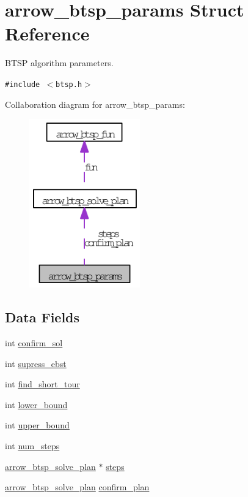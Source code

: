 \hypertarget{structarrow__btsp__params}{
\section{arrow\_\-btsp\_\-params Struct Reference}
\label{structarrow__btsp__params}
}
BTSP algorithm parameters.  


{\tt \#include $<$btsp.h$>$}

Collaboration diagram for arrow\_\-btsp\_\-params:\nopagebreak
\begin{figure}[H]
\begin{center}
\leavevmode
\includegraphics[width=136pt]{structarrow__btsp__params__coll__graph}
\end{center}
\end{figure}
\subsection*{Data Fields}
\begin{CompactItemize}
\item 
int \hyperlink{structarrow__btsp__params_2c579feb3ff41f4d73b5de97596fe465}{confirm\_\-sol}
\item 
int \hyperlink{structarrow__btsp__params_cd85b850ac7c8495a4689100e8c3182c}{supress\_\-ebst}
\item 
int \hyperlink{structarrow__btsp__params_f5fd677200b64930838c6905cbada990}{find\_\-short\_\-tour}
\item 
int \hyperlink{structarrow__btsp__params_da747e3797f9327834e4dbb1459d2786}{lower\_\-bound}
\item 
int \hyperlink{structarrow__btsp__params_b8749004215015a78139b8e4e1fb8905}{upper\_\-bound}
\item 
int \hyperlink{structarrow__btsp__params_2897d24f2fdd53c723609cf68880f55e}{num\_\-steps}
\item 
\hyperlink{structarrow__btsp__solve__plan}{arrow\_\-btsp\_\-solve\_\-plan} $\ast$ \hyperlink{structarrow__btsp__params_49aedb95b2fc4a725e3bb8485470484b}{steps}
\item 
\hyperlink{structarrow__btsp__solve__plan}{arrow\_\-btsp\_\-solve\_\-plan} \hyperlink{structarrow__btsp__params_f6a3bf7e56264d14b9dceb4ce779363c}{confirm\_\-plan}
\end{CompactItemize}



